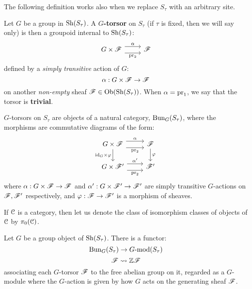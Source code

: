             The following definition works also when we replace $S_{\tau}$ with an arbitrary site.
            \begin{definition}[Torsors] \label{def: torsors}
                Let $G$ be a group in $\mathrm{Sh}(S_{\tau})$. A \textbf{$G$-torsor} on $S_{\tau}$ (if $\tau$ is fixed, then we will say  only) is then a groupoid internal to $\mathrm{Sh}(S_{\tau})$:
                    $$
                        \begin{tikzcd}
                    	{G \x \scrF } & \scrF
                    	\arrow["\alpha", shift left=2, from=1-1, to=1-2]
                    	\arrow["{\pr_2}"', shift right=2, from=1-1, to=1-2]
                        \end{tikzcd}
                    $$
                defined by a \textit{simply transitive} action of $G$:
                    $$\alpha: G \x \scrF \to \scrF$$
                on another \textit{non-empty} sheaf $\mathscr{F} \in \mathrm{Ob}(\mathrm{Sh}(S_{\tau}))$. When $\alpha = \operatorname{pr}_1$, we say that the torsor is \textbf{trivial}.

                $G$-torsors on $S_{\tau}$ are objects of a natural category, $\mathrm{Bun}_G(S_{\tau})$, where the morphisms are commutative diagrams of the form:
                    $$
                        \begin{tikzcd}
                    	{G \x \scrF } & \scrF \\
                    	{G \x \scrF'} & {\scrF'}
                    	\arrow["\alpha", shift left=2, from=1-1, to=1-2]
                    	\arrow["{\pr_2}"', shift right=2, from=1-1, to=1-2]
                    	\arrow["{\pr_2}"', shift right=2, from=2-1, to=2-2]
                    	\arrow["{\alpha'}", shift left=2, from=2-1, to=2-2]
                    	\arrow["{\id_G \x \varphi}"', from=1-1, to=2-1]
                    	\arrow["\varphi", from=1-2, to=2-2]
                        \end{tikzcd}
                    $$
                where $\alpha: G \x \scrF \to \scrF$ and $\alpha': G \x \scrF' \to \scrF'$ are simply transitive $G$-actions on $\mathscr{F}, \mathscr{F}'$ respectively, and $\varphi: \mathscr{F} \to \mathscr{F}'$ is a morphism of sheaves.
            \end{definition}
            \begin{convention}
                If $\mathcal{C}$ is a category, then let us denote the class of isomorphism classes of objects of $\mathcal{C}$ by $\pi_0(\mathcal{C})$.
            \end{convention}
            \begin{lemma}
                Let $G$ be a group object of $\mathrm{Sh}(S_{\tau})$. There is a functor:
                    $$\mathrm{Bun}_G(S_{\tau}) \to G\text{-}\mathrm{mod}(S_{\tau})$$
                    $$\mathscr{F} \leadsto \mathbb{Z}\mathscr{F}$$
                associating each $G$-torsor $\mathscr{F}$ to the free abelian group on it, regarded as a $G$-module where the $G$-action is given by how $G$ acts on the generating sheaf $\mathscr{F}$.
            \end{lemma}
